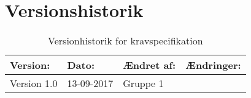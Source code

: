 \chapter{Versionshistorik}
\begin{table}[H]
\begin{center}
\begin{tabular} {| p{4cm} | p{2cm} | p{2cm} |p{5cm} |}
\hline
\textbf{Version:} & \textbf{Dato:} & \textbf{Ændret af:} & \textbf{Ændringer:} \\ \hline
Version 1.0 & 13-09-2017 & Gruppe 1 & \\ \hline
\end{tabular}
\end{center}
\caption{Versionhistorik for kravspecifikation}
\label{tb:ksversion}
\end{table}